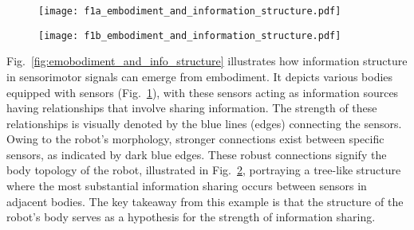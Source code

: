 \begin{figure*}[!t]
	\centering	
	\hspace*{\fill}
	\begin{subfigure}[t]{0.40\textwidth}
		\subcaption{}
		\texttt{[image: f1a\_embodiment\_and\_information\_structure.pdf]}
		\label{fig:f1a_embodiment_and_information_structure}
	\end{subfigure}	
	\hfill
	\begin{subfigure}[t]{0.40\textwidth}
		\subcaption{}
		\texttt{[image: f1b\_embodiment\_and\_information\_structure.pdf]}
		\label{fig:f1b_embodiment_and_information_structure}
	\end{subfigure}	
	\hspace*{\fill}
	\caption{\label{fig:emobodiment_and_info_structure} \textbf{Embodiment and information structure.} () Sensors on a robot exchange information at different strength levels. () This strength is associated with the embodiment of the robot, a kinematic tree in this case.}
\end{figure*}

Fig.~\ref{fig:emobodiment_and_info_structure} illustrates how information structure in sensorimotor signals can emerge from embodiment. It depicts various bodies equipped with sensors (Fig.~\ref{fig:f1a_embodiment_and_information_structure}), with these sensors acting as information sources having relationships that involve sharing information. The strength of these relationships is visually denoted by the blue lines (edges) connecting the sensors. Owing to the robot's morphology, stronger connections exist between specific sensors, as indicated by dark blue edges. These robust connections signify the body topology of the robot, illustrated in Fig.~\ref{fig:f1b_embodiment_and_information_structure}, portraying a tree-like structure where the most substantial information sharing occurs between sensors in adjacent bodies. The key takeaway from this example is that the structure of the robot's body serves as a hypothesis for the strength of information sharing.




